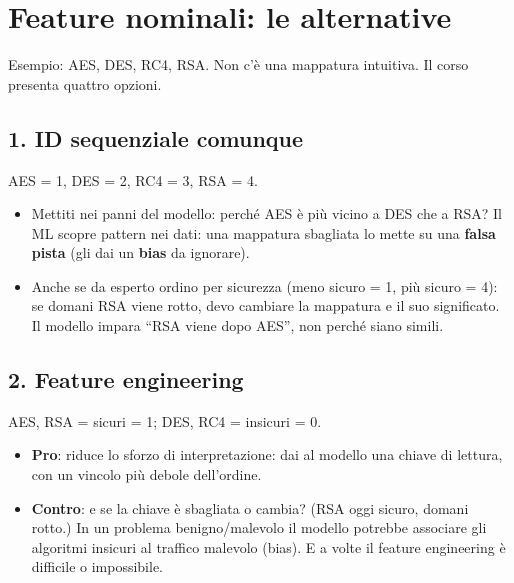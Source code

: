 \section{Feature nominali: le alternative}
Esempio: AES, DES, RC4, RSA. Non c'è una mappatura intuitiva. Il corso presenta quattro opzioni.

\subsection{1. ID sequenziale comunque}
AES = 1, DES = 2, RC4 = 3, RSA = 4.
\begin{itemize}
  \item Mettiti nei panni del modello: perché AES è più vicino a DES che a RSA? Il ML scopre pattern nei dati: una mappatura sbagliata lo
        mette su una \textbf{falsa pista} (gli dai un \textbf{bias} da ignorare).
  \item Anche se da esperto ordino per sicurezza (meno sicuro = 1, più sicuro = 4): se domani RSA viene rotto, devo cambiare la mappatura
        e il suo significato. Il modello impara ``RSA viene dopo AES'', non perché siano simili.
\end{itemize}

\subsection{2. Feature engineering}
AES, RSA = sicuri = 1; DES, RC4 = insicuri = 0.
\begin{itemize}
  \item \textbf{Pro}: riduce lo sforzo di interpretazione: dai al modello una chiave di lettura, con un vincolo più debole dell'ordine.
  \item \textbf{Contro}: e se la chiave è sbagliata o cambia? (RSA oggi sicuro, domani rotto.) In un problema benigno/malevolo il modello
        potrebbe associare gli algoritmi insicuri al traffico malevolo (bias). E a volte il feature engineering è difficile o impossibile.
\end{itemize}

